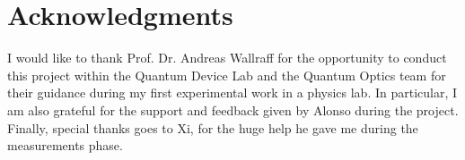 \chapter*{Acknowledgments}
\label{chap:Acknowledgments}


I would like to thank Prof. Dr. Andreas Wallraff for the opportunity to conduct this project within the Quantum Device Lab and the Quantum Optics team for their guidance during my first experimental work in a physics lab.
In particular, I am also grateful for the support and feedback given by Alonso during the project.
Finally, special thanks goes to Xi, for the huge help he gave me during the measurements phase.
